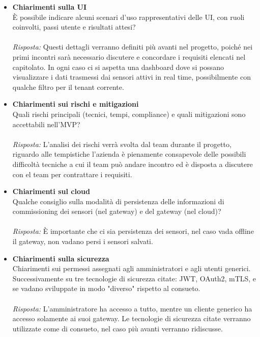 \documentclass[a4paper,12pt]{article}
\begin{document}
\begin{itemize}
    \item \textbf{Chiarimenti sulla UI}\\
    \noindent
    È possibile indicare alcuni scenari d'uso rappresentativi delle UI, con ruoli coinvolti, passi utente e risultati attesi?\\ \\
    \textit{Risposta:} 
    Questi dettagli verranno definiti più avanti nel progetto, poiché nei primi incontri sarà necessario discutere e concordare i requisiti elencati nel capitolato. In ogni caso ci si aspetta una dashboard dove si possano visualizzare i dati trasmessi dai sensori attivi in real time, possibilmente con qualche filtro per il tenant corrente.
    \vspace{1cm}

    \item \textbf{Chiarimenti sui rischi e mitigazioni}\\
    \noindent
    Quali rischi principali (tecnici, tempi, compliance) e quali mitigazioni sono accettabili nell'MVP? \\ \\
    \textit{Risposta:} 
    L'analisi dei rischi verrà svolta dal team durante il progetto, riguardo alle tempistiche l'azienda è pienamente consapevole delle possibili difficoltà tecniche a cui il team può andare incontro ed è disposta a discutere con el team per contrattare i requisiti.
    \vspace{1cm}
    
    \item \textbf{Chiarimenti sul cloud}\\
    \noindent
    Qualche consiglio sulla modalità di persistenza delle informazioni di commissioning dei sensori (nel gateway) e del gateway (nel cloud)? \\ \\
    \textit{Risposta:} 
    È importante che ci sia persistenza dei sensori, nel caso vada offline il gateway, non vadano persi i sensori salvati.
    \vspace{1cm}
    
    \item \textbf{Chiarimenti sulla sicurezza}\\
    \noindent
    Chiarimenti sui permessi assegnati agli amministratori e agli utenti generici. Successivamente su tre tecnologie di sicurezza citate: JWT, OAuth2, mTLS, e se vadano sviluppate in modo "diverso" rispetto al consueto.\\ \\
    \textit{Risposta:} 
    L'amministratore ha accesso a tutto, mentre un cliente generico ha accesso solamente ai suoi gateway.
    Le tecnologie di sicurezza citate verranno utilizzate come di consueto, nel caso più avanti verranno ridiscusse.
    \vspace{1cm}
    
\end{itemize}
\end{document}
